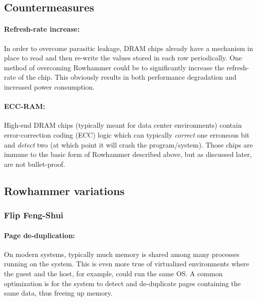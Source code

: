 \subsection{Countermeasures}
\paragraph{Refresh-rate increase:} In order to overcome parasitic leakage, DRAM chips already have a mechanism in place to read and then re-write the values stored in each row periodically. One method of overcoming Rowhammer could be to significantly increase the refresh-rate of the chip. This obviously results in both performance degradation and increased power consumption.

\paragraph{ECC-RAM:} High-end DRAM chips (typically meant for data center environments) contain error-correction coding (ECC) logic which can typically \emph{correct} one erroneous bit and \emph{detect} two (at which point it will crash the program/system). Those chips are immune to the basic form of Rowhammer described above, but as discussed later, are not bullet-proof.

\subsection{Rowhammer variations}
\subsubsection{Flip Feng-Shui}
\paragraph{Page de-duplication:} On modern systems, typically much memory is shared among many processes running on the system. This is even more true of virtualized environments where the guest and the host, for example, could run the same OS. A common optimization is for the system to detect and de-duplicate pages containing the same data, thus freeing up memory.
